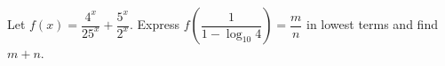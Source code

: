 Let $f(x)=\dfrac{4^x}{25^x}+\dfrac{5^x}{2^x}$. Express $f\left(\dfrac{1}{1-\log_{10}4}\right)=\dfrac{m}{n}$ in lowest terms and find $m+n$.
